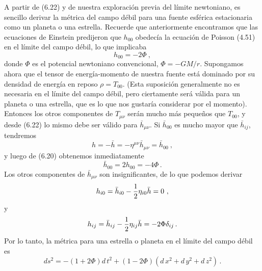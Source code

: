 \documentclass[11pt,b5paper,openany,twoside]{book}
\newcommand{\mn}{{\mu\nu}}
\begin{document}
A partir de (6.22) y de nuestra exploración previa del límite newtoniano, es sencillo derivar la métrica del campo débil para una fuente esférica estacionaria como un planeta o una estrella.
Recuerde que anteriormente encontramos que las ecuaciones de Einstein predijeron que $h_{00}$ obedecía la ecuación de Poisson (4.51) en el límite del campo débil, lo que implicaba
\begin{equation}
h_{00} = -2\Phi\ ,\label{6.24}
\end{equation}
donde $\Phi$ es el potencial newtoniano convencional, $\Phi=-GM/r$.
Supongamos ahora que el tensor de energía-momento de nuestra fuente está dominado por su densidad de energía en reposo $\rho=T_{00}$.
(Esta suposición generalmente no es necesaria en el límite del campo débil, pero ciertamente será válida para un planeta o una estrella, que es lo que nos gustaría considerar por el momento).
Entonces los otros componentes de $T_\mn$ serán mucho más pequeños que $T_{00}$, y desde (6.22) lo mismo debe ser válido para $\bar h_\mn$.
Si $\bar h_{00}$ es mucho mayor que $\bar h_{ij}$, tendremos
\begin{equation}
h = -\bar h=-\eta^\mn \bar h_\mn = \bar h_{00}\ ,\label{6.25}
\end{equation}
y luego de (6.20) obtenemos inmediatamente
\begin{equation}
\bar h_{00} = 2 h_{00} =-4\Phi\,.\label{6.26}
\end{equation}
Los otros componentes de $\bar h_{\mn}$ son insignificantes, de lo que podemos derivar
\begin{equation}
h_{i0} = \bar h_{i0} - {1\over 2}\eta_{i0}\bar h = 0\ ,\label{6.27}
\end{equation}
y
\begin{equation}
h_{ij}= \bar h_{ij} - {1\over 2}\eta_{ij}\bar h = -2\Phi\delta_{ij}\,.
\label{6.28}
\end{equation}
Por lo tanto, la métrica para una estrella o planeta en el límite del campo débil es
\begin{equation}
ds^2 = -(1+2\Phi) d\,t^2 +(1-2\Phi)( d\,x^2 + d\,y^2 + d\,z^2)\,.
\label{6.29}
\end{equation}
\end{document}
